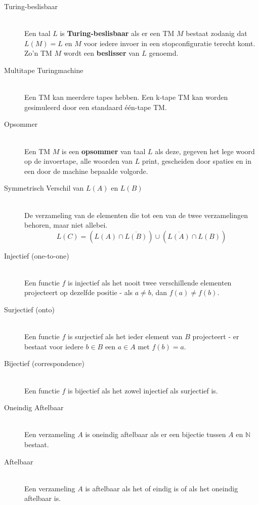 \documentclass[]{article}
\begin{document}
\begin{itemize}
\begin{description}
	\item[Turing-beslisbaar] \hfill \\
	Een taal $L$ is \textbf{Turing-beslisbaar} als er een TM $M$ bestaat zodanig dat $L(M) = L$ en $M$ voor iedere invoer in een stopconfiguratie terecht komt. Zo'n TM $M$ wordt een \textbf{beslisser} van $L$ genoemd.
	
	\item[Multitape Turingmachine] \hfill \\
	Een TM kan meerdere tapes hebben. Een k-tape TM kan worden gesimuleerd door een standaard \'{e}\'{e}n-tape TM.
	
	\item[Opsommer] \hfill \\
	Een TM $M$ is een \textbf{opsommer} van taal $L$ als deze, gegeven het lege woord op de invoertape, alle woorden van $L$ print, gescheiden door spaties en in een door de machine bepaalde volgorde.
	
	\item[Symmetrisch Verschil van $L(A)$ en $L(B)$] \hfill \\
	De verzameling van de elementen die tot een van de twee verzamelingen behoren, maar niet allebei.
	$$L(C) = \left( L(A) \cap \overline{L(B)} \right) \cup \left( \overline{L(A)} \cap L(B) \right)$$
	
	\item[Injectief (one-to-one)] \hfill \\
	Een functie $f$ is injectief als het nooit twee verschillende elementen projecteert op dezelfde positie - als $a \neq b$, dan $f(a) \neq f(b)$.
	
	\item[Surjectief (onto)] \hfill \\
	Een functie $f$ is surjectief als het ieder element van $B$ projecteert - er bestaat voor iedere $b \in B$ een $a \in A$ met $f(b) = a$.
	
	\item[Bijectief (correspondence)] \hfill \\
	Een functie $f$ is bijectief als het zowel injectief als surjectief is.
	
	\item[Oneindig Aftelbaar] \hfill \\
	Een verzameling $A$ is oneindig aftelbaar als er een bijectie tussen $A$ en $\mathbb{N}$ bestaat.
	
	\item[Aftelbaar] \hfill \\
	Een verzameling $A$ is aftelbaar als het of eindig is of als het oneindig aftelbaar is.
	

\end{description}
\end{itemize}
\end{document}

